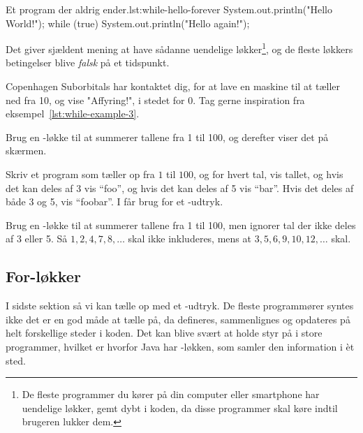 		\begin{JavaCode}{Et program der aldrig ender.}{lst:while-hello-forever}
			System.out.println("Hello World!");
			while (true) {
				System.out.println("Hello again!");
			}
		\end{JavaCode}

        Det giver sjældent mening at have sådanne uendelige
        løkker\footnote{De fleste programmer du kører på din computer
        eller smartphone har uendelige løkker, gemt dybt i koden, da
        disse programmer skal køre indtil brugeren lukker dem.}, og de
        fleste løkkers betingelser blive \emph{falsk} på et
        tidspunkt.

		\begin{exercise}
			Copenhagen Suborbitals har kontaktet dig, for at lave en maskine til
            at tæller ned fra 10, og vise "Affyring!", i stedet for 0.
            Tag gerne inspiration fra
            eksempel~\ref{lst:while-example-3}.
		\end{exercise}

		\begin{exercise}
            Brug en -løkke til at summerer tallene
            fra 1 til 100, og derefter viser det på skærmen.
		\end{exercise}

		\begin{exercise}
            Skriv et program som tæller op fra \(1\) til \(100\), og
            for hvert tal, vis tallet, og hvis det kan deles af 3 vis
            ``foo'', og hvis det kan deles af 5 vis ``bar''. Hvis det
            deles af både 3 og 5, vis ``foobar''.  I får brug for et
            -udtryk.
        \end{exercise}

		\begin{exercise}
            Brug en -løkke til at summerer tallene
            fra 1 til 100, men ignorer tal der ikke deles af 3 eller
            5. Så \(1, 2, 4, 7, 8, \dots\) skal ikke inkluderes, mens
            at \(3, 5, 6, 9, 10, 12, \dots\) skal.
        \end{exercise}

	\subsection{For-løkker}

		I sidste sektion så vi kan tælle op med et -udtryk.
        De fleste programmører syntes ikke det er en god måde at tælle
        på, da  defineres, sammenlignes og opdateres på
        helt forskellige steder i koden.  Det kan blive svært at holde
        styr på i store programmer, hvilket er hvorfor Java har
        -løkken, som samler den information i
		èt sted.

